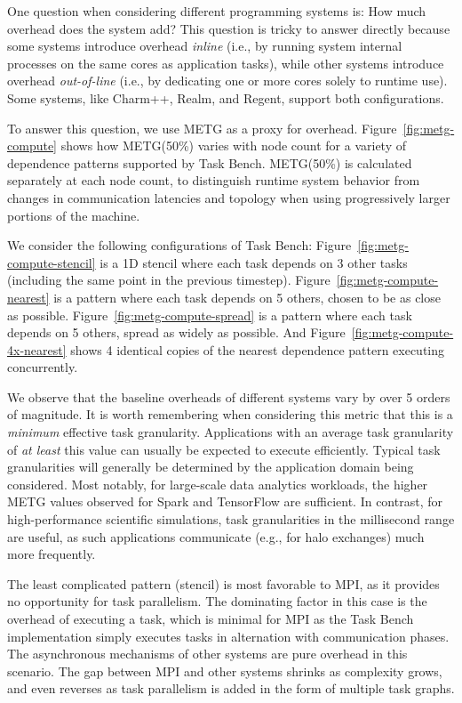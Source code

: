One question when considering different programming
systems is: How much overhead does the system add? This question is tricky to answer directly because some systems introduce
overhead \emph{inline} (i.e., by running system internal processes on
the same cores as application tasks), while other systems introduce
overhead \emph{out-of-line} (i.e., by dedicating one or more cores
solely to runtime use). Some systems, like Charm++, Realm, and Regent,
support both configurations.

To answer this question, we use METG %
as a proxy for overhead. Figure~\ref{fig:metg-compute}
shows how METG(50\%) varies with node count for a variety of
dependence patterns supported by Task Bench. METG(50\%) is calculated
separately at each node count, to distinguish runtime system behavior from
changes in communication latencies and topology when using
progressively larger portions of the machine.

We consider the following configurations of Task Bench:
Figure~\ref{fig:metg-compute-stencil} is a 1D stencil where each task
depends on 3 other tasks (including the same point in the previous
timestep). Figure~\ref{fig:metg-compute-nearest} is a pattern where
each task depends on 5 others, chosen to be as close as
possible. Figure~\ref{fig:metg-compute-spread} is a pattern where each
task depends on 5 others, spread as widely as possible. And
Figure~\ref{fig:metg-compute-4x-nearest} shows 4 identical copies of
the nearest dependence pattern executing concurrently.

We observe that the baseline overheads of different
systems vary by over 5 orders of magnitude. It is worth
remembering when considering this metric that this is a \emph{minimum}
effective task granularity. Applications with an average
task granularity of \emph{at least} this value can usually be expected
to execute efficiently. Typical task granularities will
generally be determined by the application domain being
considered. Most notably, for large-scale data analytics workloads, the higher METG values observed for Spark and
TensorFlow are sufficient. In contrast, for high-performance
scientific simulations, task granularities in the millisecond range
are useful, as such applications communicate (e.g., for halo
exchanges) much more frequently.

The least complicated pattern (stencil) is most favorable
to MPI, as it provides no
opportunity for task parallelism. The
dominating factor in this case is the overhead of executing a task, which is
minimal for MPI as the Task Bench implementation simply executes tasks in alternation with
communication phases. The asynchronous
mechanisms of other systems are pure overhead in this scenario.
The gap between MPI and other systems shrinks as complexity grows, and even reverses as task parallelism is
added in the form of multiple task graphs.

